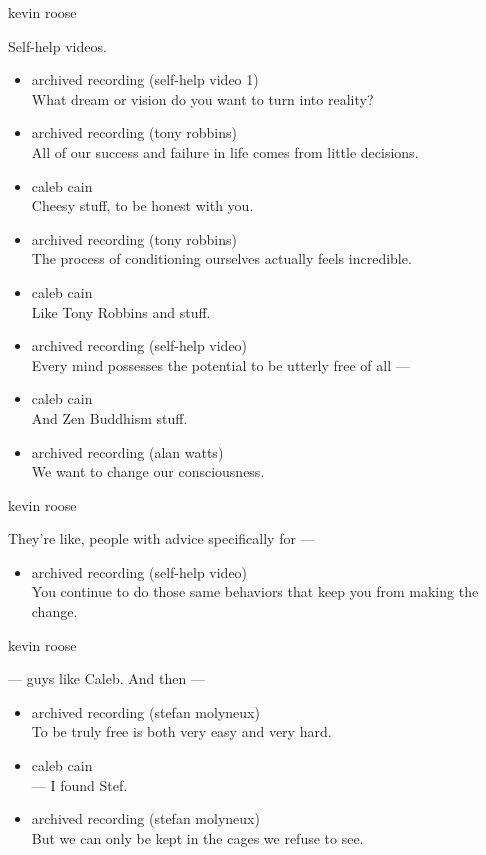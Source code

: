kevin roose

Self-help videos.

\begin{itemize}
\item
  archived recording (self-help video 1)\\
  What dream or vision do you want to turn into reality?
\item
  archived recording (tony robbins)\\
  All of our success and failure in life comes from little decisions.
\item
  caleb cain\\
  Cheesy stuff, to be honest with you.
\item
  archived recording (tony robbins)\\
  The process of conditioning ourselves actually feels incredible.
\item
  caleb cain\\
  Like Tony Robbins and stuff.
\item
  archived recording (self-help video)\\
  Every mind possesses the potential to be utterly free of all ---
\item
  caleb cain\\
  And Zen Buddhism stuff.
\item
  archived recording (alan watts)\\
  We want to change our consciousness.
\end{itemize}

kevin roose

They're like, people with advice specifically for ---

\begin{itemize}
\tightlist
\item
  archived recording (self-help video)\\
  You continue to do those same behaviors that keep you from making the
  change.
\end{itemize}

kevin roose

--- guys like Caleb. And then ---

\begin{itemize}
\item
  archived recording (stefan molyneux)\\
  To be truly free is both very easy and very hard.
\item
  caleb cain\\
  --- I found Stef.
\item
  archived recording (stefan molyneux)\\
  But we can only be kept in the cages we refuse to see.
\end{itemize}

